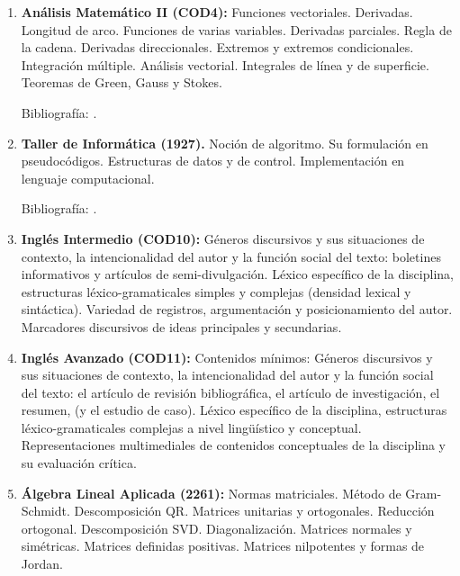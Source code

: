 \documentclass[a4paper, 12pt]{article}
\begin{document}
\begin{enumerate}
\item \textbf{Análisis Matemático II (COD4):} Funciones vectoriales. Derivadas. Longitud de
arco. Funciones de varias variables. Derivadas parciales. Regla de
la cadena. Derivadas direccionales. Extremos y extremos
condicionales. Integración múltiple. Análisis vectorial.
Integrales de línea y de superficie. Teoremas de Green, Gauss y
Stokes.

Bibliografía: \cite{ marsdentromba,MarianoGiaquinta641,ErnstHairer633,PeterD.Lax632,thomas2006c}.


\item \textbf{Taller de Informática (1927).} Noción de algoritmo. Su formulación en pseudocódigos. Estructuras de datos y de control. Implementación
en lenguaje computacional.

Bibliografía: \cite{Seroul:2000,Rose:2015}.









\item\textbf{Inglés Intermedio (COD10):} Géneros discursivos y sus situaciones de contexto, la intencionalidad del autor y la función social del texto: boletines informativos y artículos de semi-divulgación. Léxico específico de la disciplina, estructuras léxico-gramaticales simples y complejas (densidad lexical y sintáctica). Variedad de registros, argumentación y posicionamiento del autor. Marcadores discursivos de ideas principales y secundarias.

 




\item\textbf{Inglés Avanzado (COD11):}  Contenidos mínimos: Géneros discursivos y sus situaciones de contexto, la intencionalidad del autor y la función social del texto: el artículo de revisión bibliográfica, el artículo de investigación, el resumen, (y el estudio de caso). Léxico específico de la disciplina, estructuras léxico-gramaticales complejas a nivel lingüístico y conceptual. Representaciones multimediales de contenidos conceptuales de la disciplina y su evaluación crítica.




 


\item\textbf{Álgebra Lineal Aplicada (2261):}  Normas matriciales.
Método de Gram-Sch\-midt. Descomposición QR.
Matrices unitarias y ortogonales. Reducción ortogonal.
Descomposición SVD. Diagonalización. Matrices normales y simétricas. Matrices
definidas positivas. Matrices nilpotentes y formas de Jordan.


\end{enumerate}
\end{document}
